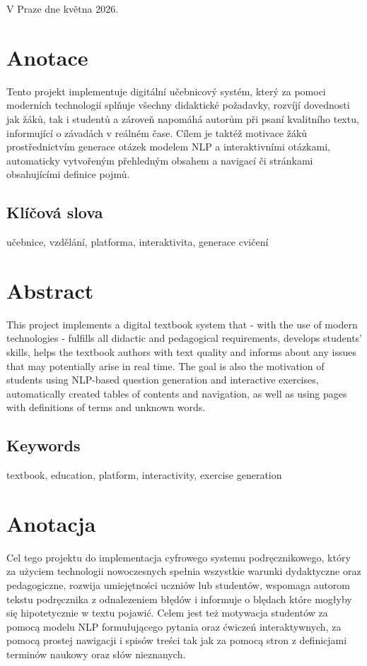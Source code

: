 \documentclass[12pt]{article}
\begin{document}
 	\vspace*{4cm}

 	  \hfill V Praze dne \hspace*{0,1cm}  \hrulefill \hspace*{0,1cm}  května 2026.

 	\newpage
 	\section*{Anotace}
 	Tento projekt implementuje digitální učebnicový systém, který za pomoci moderních technologií splňuje všechny didaktické požadavky, rozvíjí dovednosti jak žáků, tak i studentů a zároveň napomáhá autorům při psaní kvalitního textu, informující o závadách v reálném čase. Cílem je taktéž motivace žáků prostřednictvím generace otázek modelem NLP a interaktivními otázkami, automaticky vytvořeným přehledným obsahem a navigací či stránkami obsahujícími definice pojmů.
 	
 	\subsection*{Klíčová slova}
 	učebnice, vzdělání, platforma, interaktivita, generace cvičení

 	\section*{Abstract}
 	This project implements a digital textbook system that - with the use of modern technologies - fulfills all didactic and pedagogical requirements, develops students' skills, helps the textbook authors with text quality and informs about any issues that may potentially arise in real time. The goal is also the motivation of students using NLP-based question generation and interactive exercises, automatically created tables of contents and navigation, as well as using pages with definitions of terms and unknown words.\\
 	
 	\subsection*{Keywords}
 	textbook, education, platform, interactivity, exercise generation

 	\section*{Anotacja}
 	Cel tego projektu do implementacja cyfrowego systemu podręcznikowego, który za użyciem technologii nowoczesnych spełnia wszystkie warunki dydaktyczne oraz pedagogiczne, rozwija umiejętności uczniów lub studentów, wspomaga autorom tekstu podręcznika z odnalezeniem błędów i informuje o blędach które mogłyby się hipotetycznie w textu pojawić.  Celem jest też motywacja studentów za pomocą modelu NLP formułującego pytania oraz ćwiczeń interaktywnych, za pomocą prostej nawigacji i spisów treści tak jak za pomocą stron z definicjami terminów naukowy oraz słów nieznanych.
 	
\end{document}
